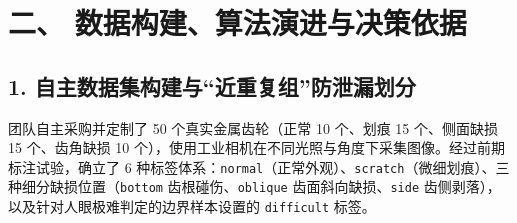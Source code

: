 


\section*{二、 数据构建、算法演进与决策依据}


\subsection*{1. 自主数据集构建与“近重复组”防泄漏划分}
团队自主采购并定制了 50 个真实金属齿轮（正常 10 个、划痕 15 个、侧面缺损 15 个、齿角缺损 10 个），使用工业相机在不同光照与角度下采集图像。经过前期标注试验，确立了 6 种标签体系：\texttt{normal}（正常外观）、\texttt{scratch}（微细划痕）、三种细分缺损位置（\texttt{bottom} 齿根碰伤、\texttt{oblique} 齿面斜向缺损、\texttt{side} 齿侧剥落），以及针对人眼极难判定的边界样本设置的 \texttt{difficult} 标签。

